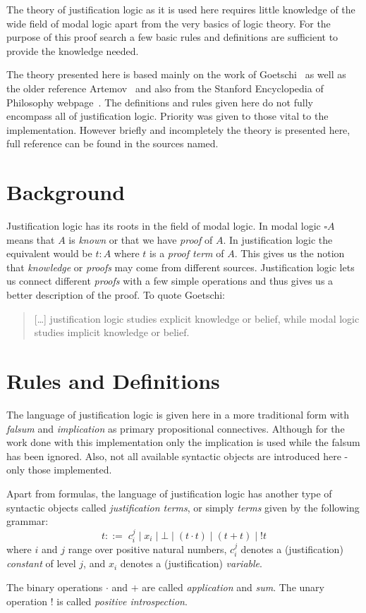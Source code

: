 The theory of justification logic as it is used here requires little knowledge of the wide field of modal logic apart from the very basics of logic theory. For the purpose of this proof search a few basic rules and definitions are sufficient to provide the knowledge needed. 

The theory presented here is based mainly on the work of Goetschi~\cite{goet} as well as the older reference Artemov~\cite{art} and also from the Stanford Encyclopedia of Philosophy webpage~\cite{stan}. The definitions and rules given here do not fully encompass all of justification logic. Priority was given to those vital to the implementation. However briefly and incompletely the theory is presented here, full reference can be found in the sources named. 

\section{Background}
Justification logic has its roots in the field of modal logic. 
In modal logic $\square A$ means that $A$ is \emph{known} or that we have \emph{proof} of $A$. In justification logic the equivalent would be $t:A$ where $t$ is a \emph{proof term} of $A$. This gives us the notion that \emph{knowledge} or \emph{proofs} may come from different sources. Justification logic lets us connect different \emph{proofs} with a few simple operations and thus gives us a better description of the proof. To quote Goetschi: \begin{quote}[\dots] justification logic studies explicit knowledge or belief, while modal logic studies implicit knowledge or belief.\end{quote}

\section{Rules and Definitions}

The language of justification logic is given here in a more traditional form with \emph{falsum} and \emph{implication} as primary propositional connectives. Although for the work done with this implementation only the implication is used while the falsum has been ignored. Also, not all available syntactic objects are introduced here - only those implemented.

\begin{definition}\label{justification_terms} Apart from formulas, the language of justification logic has another type of syntactic objects called \emph{justification terms}, or simply \emph{terms} given by the following grammar:
\[
	t::=  \;c_{i}^{j}\; |\; x_i \;|\; \bot \; |\; (t \cdot t)\; |\; (t+t)\; |\; !t
\]
where $i$ and $j$ range over positive natural numbers, $c_{i}^{j}$ denotes a (justification) \emph{constant} of level $j$, and $x_i$ denotes a (justification) \emph{variable}.

The binary operations $\cdot$ and $+$ are called \emph{application} and \emph{sum}. The unary operation $!$ is called \emph{positive introspection}.
\end{definition}

